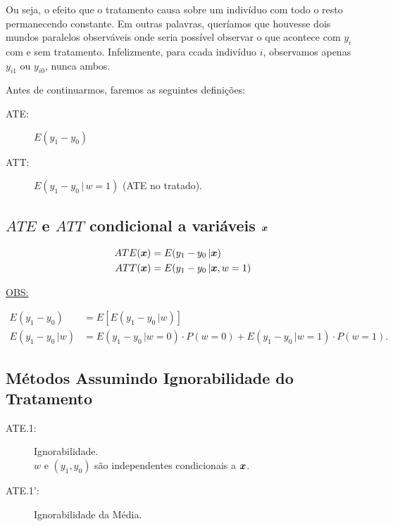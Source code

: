 \documentclass[11pt,oneside,a4paper]{article}
\numberwithin{equation}{section}
\begin{document}
\begin{description}
\begin{description}
Ou seja, o efeito que o tratamento causa sobre um indivíduo com todo o resto permanecendo constante.
Em outras palavras, queríamos que houvesse dois mundos paralelos observáveis onde seria possível observar o que acontece com $y_{i}$ com e sem tratamento.
Infelizmente, para ccada indivíduo $i$, observamos apenas $y_{i1}$ ou $y_{i0}$, nunca ambos.

Antes de continuarmos, faremos as seguintes definições:

\begin{description}
	\item[ATE:]  $E( y_{1} - y_{0} )$
	\item[ATT:]  $E( y_{1} - y_{0} \, | \, w = 1 )$ (ATE no tratado).
\end{description}

\subsection*{$ATE$ e $ATT$ condicional a variáveis $\boldsymbol{x}$ }

\vspace{-1 em}
\begin{align*}
ATE( \boldsymbol{x} ) &= E( y_1 - y_0 \, | \boldsymbol{x})
\\
ATT( \boldsymbol{x} ) &= E( y_1 - y_0 \, | \boldsymbol{x}, w = 1)
\end{align*}

\noindent
\underline{OBS:}

\vspace{-1 em}
\begin{align*}
E( y_1 - y_0 ) &= E \left[ E( y_1 - y_0 \, | w) \right]
\\
E( y_1 - y_0 \, | w ) &=
E( y_1 - y_0 \, | w = 0 ) \cdot P(w=0)
+
E( y_1 - y_0 \, | w = 1 ) \cdot P(w=1).
\end{align*}

\subsection*{Métodos Assumindo Ignorabilidade do Tratamento}

\begin{description}
\item[ATE.1:] Ignorabilidade. 
\\
$w$ e $(y_{1}, y_{0})$ são independentes condicionais a $\boldsymbol{x}$.

\item[ATE.1':] Ignorabilidade da Média. 


\end{description}
\end{description}
\end{description}
\end{document}
